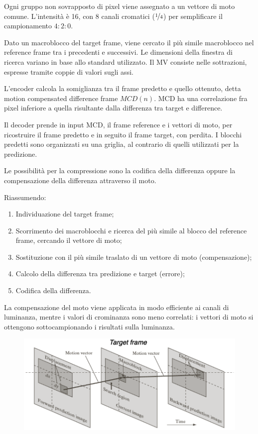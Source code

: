 Ogni gruppo non sovrapposto di pixel viene assegnato a un vettore di moto comune. L'intensità è 16, con 8 canali cromatici ($\nicefrac{1}{4}$) per semplificare il campionamento $4 : 2 : 0$. 

Dato un macroblocco del target frame, viene cercato il più simile macroblocco nel reference frame tra i precedenti e successivi. Le dimensioni della finestra di ricerca variano in base allo standard utilizzato. Il MV consiste nelle sottrazioni, espresse tramite coppie di valori sugli assi.

L'encoder calcola la somiglianza tra il frame predetto e quello ottenuto, detta motion compensated difference frame $MCD(n)$. MCD ha una correlazione fra pixel inferiore a quella risultante dalla differenza tra target e difference.

Il decoder prende in input MCD, il frame reference e i vettori di moto, per ricostruire il frame predetto e in seguito il frame target, con perdita. I blocchi predetti sono organizzati su una griglia, al contrario di quelli utilizzati per la predizione.

Le possibilità per la compressione sono la codifica della differenza oppure la compensazione della differenza attraverso il moto. 

Riassumendo:
\begin{enumerate}
	\item Individuazione del target frame;
	\item Scorrimento dei macroblocchi e ricerca del più simile al blocco del reference frame, cercando il vettore di moto;
	\item Sostituzione con il più simile traslato di un vettore di moto (compensazione);
	\item Calcolo della differenza tra predizione e target (errore);
	\item Codifica della differenza.
\end{enumerate}

La compensazione del moto viene applicata in modo efficiente ai canali di luminanza, mentre i valori di crominanza sono meno correlati: i vettori di moto si ottengono sottocampionando i risultati sulla luminanza.

\begin{figure}[h]
	\centering
	\includegraphics[scale=0.4]{Lezioni/Immagini/motion-estimation}
\end{figure}

